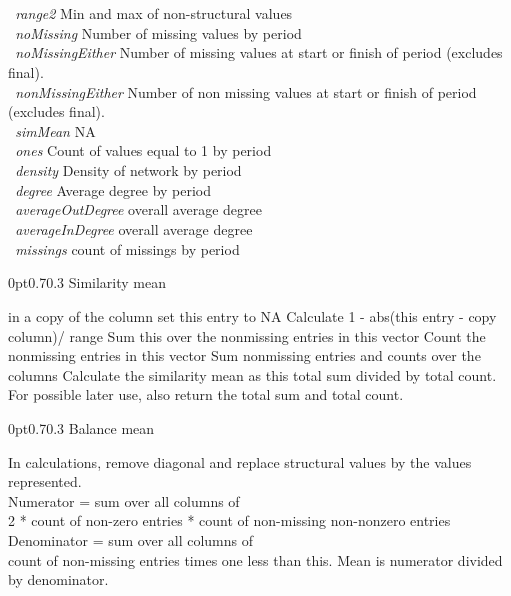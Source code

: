 \documentclass[12pt,a4paper]{article}
\makeatletter
\renewcommand{\=}{\,=\,}
\newcommand{\+}{\,+\,}
\newcommand{\nnm}[1]{\textsf{\textit{#1}}}
\renewcommand{\subsection}{\@startsection{subsection}{2}
                {0pt}{0.7\baselineskip}{0.3\baselineskip}
                {\sffamily} }
\newcommand{\sfn}[1]{\textbf{\texttt{#1}}}
\makeatother
\begin{document}
\begin{algorithmic}
\sfn{ }\nnm{range2} Min and max of non-structural values\\
\sfn{ }\nnm{noMissing} Number of missing values by period\\
\sfn{ }\nnm{noMissingEither} Number of missing values at start or finish of
period (excludes final).\\
\sfn{ }\nnm{nonMissingEither} Number of non missing values at start or finish of
period (excludes final).\\
\sfn{ }\nnm{simMean} NA\\
\sfn{ }\nnm{ones} Count of values equal to 1 by period\\
\sfn{ }\nnm{density} Density of network by period\\
\sfn{ }\nnm{degree} Average degree by period\\
\sfn{ }\nnm{averageOutDegree} overall average degree\\
\sfn{ }\nnm{averageInDegree} overall average degree\\
\sfn{ }\nnm{missings} count of missings by period\\
\ENDIF
\ENDIF
\end{algorithmic}
\subsection{Similarity mean}
\label{sec:similarityMean}
\begin{algorithmic}
\STATE in a copy of the column set this entry to NA
\STATE Calculate 1 - abs(this entry - copy column)/ range
\STATE Sum this over the nonmissing entries in this vector
\STATE Count the nonmissing entries in this vector
\ENDFOR
\ENDFOR
\STATE Sum nonmissing entries and counts over the columns
\STATE Calculate the similarity mean as this total sum divided by total count.
\STATE For possible later use, also return the total sum and total count.
\end{algorithmic}
\subsection{Balance mean}
\label{sec:balmean}
\begin{algorithmic}
\STATE In calculations, remove diagonal and replace structural values by the
values represented.\\
\STATE Numerator = sum over all columns of\\
2 * count of non-zero entries * count of non-missing non-nonzero entries\\
\STATE Denominator = sum over all columns of \\
count of non-missing entries times one less than this.
\STATE Mean is numerator divided by denominator.
\end{algorithmic}
\end{document}
